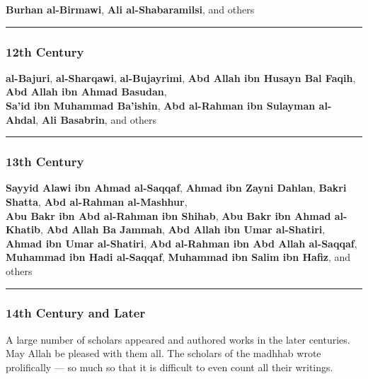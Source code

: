 \documentclass[
  a4paper,
  DIV=11,
  numbers=noendperiod]{scrartcl}
\begin{document}
\textbf{Burhan al-Birmawi}, \textbf{Ali al-Shabaramilsi}, and others

\begin{center}\rule{0.5\linewidth}{0.5pt}\end{center}

\subsubsection{12th Century}\label{th-century-8}

\textbf{al-Bajuri}, \textbf{al-Sharqawi}, \textbf{al-Bujayrimi},
\textbf{Abd Allah ibn Husayn Bal Faqih}, \textbf{Abd Allah ibn Ahmad
Basudan},\\
\textbf{Sa'id ibn Muhammad Ba'ishin}, \textbf{Abd al-Rahman ibn Sulayman
al-Ahdal}, \textbf{Ali Basabrin}, and others

\begin{center}\rule{0.5\linewidth}{0.5pt}\end{center}

\subsubsection{13th Century}\label{th-century-9}

\textbf{Sayyid Alawi ibn Ahmad al-Saqqaf}, \textbf{Ahmad ibn Zayni
Dahlan}, \textbf{Bakri Shatta}, \textbf{Abd al-Rahman al-Mashhur},\\
\textbf{Abu Bakr ibn Abd al-Rahman ibn Shihab}, \textbf{Abu Bakr ibn
Ahmad al-Khatib}, \textbf{Abd Allah Ba Jammah}, \textbf{Abd Allah ibn
Umar al-Shatiri},\\
\textbf{Ahmad ibn Umar al-Shatiri}, \textbf{Abd al-Rahman ibn Abd Allah
al-Saqqaf}, \textbf{Muhammad ibn Hadi al-Saqqaf}, \textbf{Muhammad ibn
Salim ibn Hafiz}, and others

\begin{center}\rule{0.5\linewidth}{0.5pt}\end{center}

\subsubsection{14th Century and Later}\label{th-century-and-later}

A large number of scholars appeared and authored works in the later
centuries. May Allah be pleased with them all. The scholars of the
madhhab wrote prolifically --- so much so that it is difficult to even
count all their writings.
\end{document}
